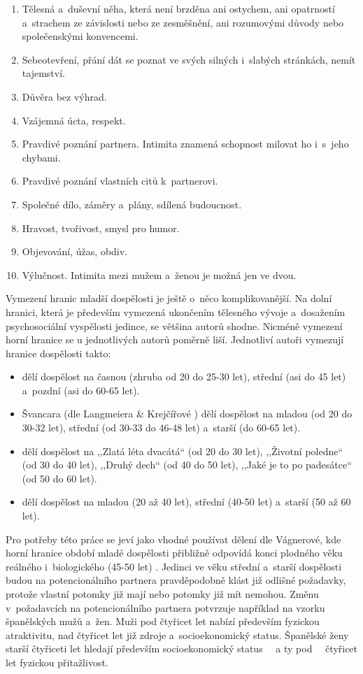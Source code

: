 \documentclass[a4paper, 12pt, notitlepage, oneside, numbers=noenddot]{report}
\begin{document}
\begin{enumerate}
\item Tělesná a~duševní něha, která není brzděna ani ostychem, ani
  opatrností a~strachem ze závislosti nebo ze zesměšnění, ani
  rozumovými důvody nebo společenskými konvencemi.
\item Sebeotevření, přání dát se poznat ve svých silných i~slabých
  stránkách, nemít tajemství.
\item Důvěra bez výhrad.
\item Vzájemná úcta, respekt.
\item Pravdivé poznání partnera.  Intimita znamená schopnost milovat
  ho i~s~jeho chybami.
\item Pravdivé poznání vlastních citů k~partnerovi.
\item Společné dílo, záměry a~plány, sdílená budoucnost.
\item Hravost, tvořivost, smysl pro humor.
\item Objevování, úžas, obdiv.
\item Výlučnost.  Intimita mezi mužem a~ženou je možná jen ve dvou.
\end{enumerate}

Vymezení hranic mladší dospělosti je ještě o~něco komplikovanější.  Na
dolní hranici, která je především vymezená ukončením tělesného vývoje
a~dosažením psychosociální vyspělosti jedince, se většina autorů
shodne.  Nicméně vymezení horní hranice se u jednotlivých autorů
poměrně liší.  Jednotliví autoři vymezují hranice dospělosti takto:

\begin{itemize}
\item \citet{LangmeierKrejcirova2007} dělí dospělost na časnou (zhruba
  od 20 do 25-30 let), střední (asi do 45 let) a~pozdní (asi do 60-65
  let).
\item Švancara (dle Langmeiera \& Krejčířové
  \citeyearpar{LangmeierKrejcirova2007}) dělí dospělost na mladou (od
  20 do 30-32 let), střední (od 30-33 do 46-48 let) a~starší (do 60-65
  let).
\item \citet{Rican2006} dělí dospělost na ,,Zlatá léta dvacátá`` (od 20 do
  30 let), ,,Životní poledne`` (od 30 do 40 let), ,,Druhý dech`` (od
  40 do 50 let), ,,Jaké je to po padesátce`` (od 50 do 60 let).
\item \citet{Vagnerova2007} dělí dospělost na mladou (20 až 40 let),
  střední (40-50 let) a~starší (50 až 60 let).
\end{itemize}
Pro potřeby této práce se jeví jako vhodné používat dělení dle
Vágnerové, kde horní hra\-ni\-ce období mladé dospělosti přibližně
odpovídá konci plodného věku reálného \citep{CSU2006,CSU2003}
i~biologického (45-50 let) \citep{Rozsypal2003}.  Jedinci ve věku
střední a~starší dospělosti budou na potencionálního partnera
pravděpodobně klást již odlišné požadavky, protože vlastní potomky již
mají nebo potomky již mít nemohou.  Změnu v~požadavcích na
potencionálního partnera potvrzuje například
\citet{Gil-BurmanPelaezSanchez2002} na vzorku španělských mužů a~žen.
Muži pod čtyřicet let nabízí především fyzickou atraktivitu, nad
čtyřicet let již zdroje a~socioekonomický status.  Španělské ženy
starší čtyřiceti let hledají především socioekonomický status ~~a ty
pod~~ čtyřicet let fyzickou přitažlivost.
\end{document}
